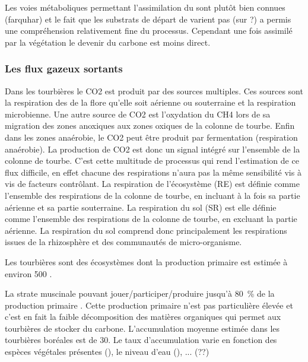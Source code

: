 Les voies métaboliques permettant l'assimilation du \coo sont plutôt bien connues (farquhar) et le fait que les substrats de départ de varient pas (sur ?) a permis une compréhension relativement fine du processus.
Cependant une fois assimilé par la végétation le devenir du carbone est moins direct.

\subsubsection{Les flux gazeux sortants}
Dans les tourbières le CO2 est produit par des sources multiples.
Ces sources sont la respiration des de la flore qu'elle soit aérienne ou souterraine et la respiration microbienne.
Une autre source de CO2 est l'oxydation du CH4 lors de sa migration des zones anoxiques aux zones oxiques de la colonne de tourbe.
Enfin dans les zones anaérobie, le CO2 peut être produit par fermentation (respiration anaérobie).
La production de CO2 est donc un signal intégré sur l'ensemble de la colonne de tourbe. 
C'est cette multitude de processus qui rend l'estimation de ce flux difficile, en effet chacune des respirations n'aura pas la même sensibilité vis à vis de facteurs contrôlant.
La respiration de l'écosystème (RE) est définie comme l'ensemble des respirations de la colonne de tourbe, en incluant à la fois sa partie aérienne et sa partie souterraine. 
La respiration du sol (SR) est elle définie comme l'ensemble des respirations de la colonne de tourbe, en excluant la partie aérienne.
La respiration du sol comprend donc principalement les respirations issues de la rhizosphère et des communautés de micro-organisme.

Les tourbières sont des écosystèmes dont la production primaire est estimée à environ \SI{500}{\gcm} \cite{francez2000}. 


La strate muscinale pouvant jouer/participer/produire jusqu'à \SI{80}{\percent} de la production primaire \cite{francez2000}.
Cette production primaire n'est pas particulière élevée \plop et c'est en fait la faible décomposition des matières organiques qui permet aux tourbières de stocker du carbone.
L'accumulation moyenne estimée dans les tourbières boréales est de \SI{30}{\gcm}. Le taux d'accumulation varie en fonction des espèces végétales présentes (\plop), le niveau d'eau (\plop), ... (??)



